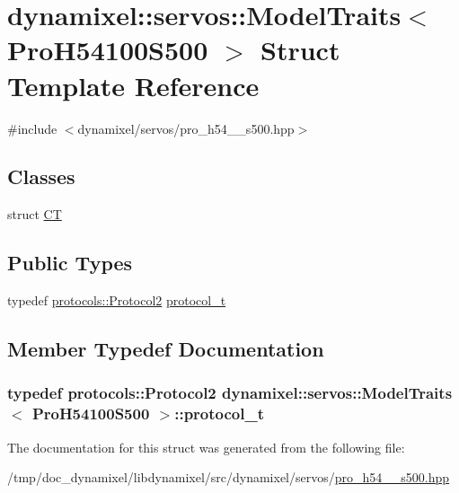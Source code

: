\hypertarget{structdynamixel_1_1servos_1_1_model_traits_3_01_pro_h54100_s500_01_4}{}\section{dynamixel\+:\+:servos\+:\+:Model\+Traits$<$ Pro\+H54100\+S500 $>$ Struct Template Reference}
\label{structdynamixel_1_1servos_1_1_model_traits_3_01_pro_h54100_s500_01_4}


{\ttfamily \#include $<$dynamixel/servos/pro\+\_\+h54\+\_\+\_\+s500.\+hpp$>$}

\subsection*{Classes}
\begin{DoxyCompactItemize}
\item 
struct \hyperlink{structdynamixel_1_1servos_1_1_model_traits_3_01_pro_h54100_s500_01_4_1_1_c_t}{CT}
\end{DoxyCompactItemize}
\subsection*{Public Types}
\begin{DoxyCompactItemize}
\item 
typedef \hyperlink{classdynamixel_1_1protocols_1_1_protocol2}{protocols\+::\+Protocol2} \hyperlink{structdynamixel_1_1servos_1_1_model_traits_3_01_pro_h54100_s500_01_4_a16c80afe5f39285b5b7db40805c976cd}{protocol\+\_\+t}
\end{DoxyCompactItemize}


\subsection{Member Typedef Documentation}
\subsubsection[{\texorpdfstring{protocol\+\_\+t}{protocol_t}}]{\setlength{\rightskip}{0pt plus 5cm}typedef {\bf protocols\+::\+Protocol2} {\bf dynamixel\+::servos\+::\+Model\+Traits}$<$ {\bf Pro\+H54100\+S500} $>$\+::{\bf protocol\+\_\+t}}\hypertarget{structdynamixel_1_1servos_1_1_model_traits_3_01_pro_h54100_s500_01_4_a16c80afe5f39285b5b7db40805c976cd}{}\label{structdynamixel_1_1servos_1_1_model_traits_3_01_pro_h54100_s500_01_4_a16c80afe5f39285b5b7db40805c976cd}


The documentation for this struct was generated from the following file\+:\begin{DoxyCompactItemize}
\item 
/tmp/doc\+\_\+dynamixel/libdynamixel/src/dynamixel/servos/\hyperlink{pro__h54__100__s500_8hpp}{pro\+\_\+h54\+\_\+\_\+s500.\+hpp}\end{DoxyCompactItemize}

